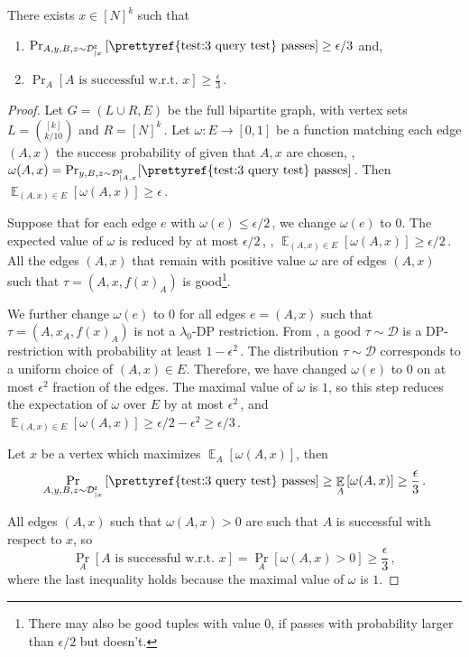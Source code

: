 \documentclass{toc}
\newcommand{\Prob}[2][]{\Pr_{{#1}}\left[#2\right]} %
\DeclareMathOperator*{\E}{\mathbb{E}} %
\newcommand{\Ex}[2][]{\E_{{#1}}\Brac{#2}} %
\newcommand{\Brac}[1]{\left[#1\right]} %
\newcommand\f{f} %
\newcommand{\D}{\mathcal{D}^{\mathsf{z}}} %
\begin{document}
\begin{claim}\label{claim:fix x}
	There exists  $x\in[N]^k$ such that
	\begin{enumerate}
	\item  $\Prob[A,y,B,z\sim \D_{|x}]{\textrm{\prettyref{test:3 query test} passes}}\geq 
	\epsilon/3$ %
	 and,
	\item
	$\Prob[A]{A \textrm{ is successful w.r.t. }x}\geq \frac{\epsilon}{3}$\,.
	\end{enumerate}
\end{claim}
\begin{proof}
	Let $G=(L\cup R,E)$ be the full bipartite graph, with vertex sets $L = \binom{[k]}{k/10}$ and $R = [N]^k$\,. Let $\omega:E\rightarrow[0,1]$ be a function matching each edge  $(A,x)$ the success probability of   given that $A,x$ are chosen, \ie, $\omega(A,x) =\Pr_{y,B,z \sim \D_{|A,x}}[\textrm{\prettyref{test:3 query test} passes}]$\,. Then $\E_{(A,x)\in E}[\omega(A,x)]\geq \epsilon$\,.
	
	Suppose that for each edge $e$ with $\omega(e)\leq 
\epsilon/2$\,, %
 we change $\omega(e)$ to $0$. The expected value of $\omega$ is reduced by at most 
$\epsilon/2$\,, %
 \ie, $\E_{(A,x)\in E}[\omega(A,x)]\geq 
	\epsilon/2$\,. %
	All the edges $ (A,x)$ that remain with positive value $\omega$ are of edges $(A,x)$ such that $\tau=(A,x,\f(x)_A)$ is good\footnote{There may also be good tuples with value $0$, if  passes with probability larger than 
	$\epsilon/2$ %
	 but  doesn't.}. 
	
	We further change $\omega(e)$ to $0$  for all edges $e=(A,x)$ such that $\tau = (A,x_A,\f(x)_A)$ is not a $\lambda_0$-DP restriction.
	From , a good $\tau\sim\mathcal{D}$ is a DP-restriction with probability at least $1-\epsilon^2$\,. The distribution $\tau\sim\mathcal{D}$ corresponds to a uniform choice of $(A,x)\in E$. Therefore, we have changed $\omega(e)$ to $0$ on at most $\epsilon^2$ fraction of the edges. The maximal value of $\omega$ is $1$, so this step reduces the expectation of $\omega$ over $E$  by at most $\epsilon^2$\,, and  $\E_{(A,x)\in E}[\omega(A,x)]\geq 
	\epsilon/2-\epsilon^2 \geq \epsilon/3$\,. %
	
	Let $x$ be a vertex which maximizes $\E_{A}[\omega(A,x)]$, then
	\[\Prob[A,y,B,z\sim \D_{|x}]{\textrm{\prettyref{test:3 query test} passes}} \geq \Ex[A]{\omega(A,x)} \geq  \frac{\epsilon}{3}\,. \]%
	
	All edges $(A,x)$ such that $\omega(A,x)>0$ are such that $A$ is successful with respect to $x$, so
	\[\Prob[A]{A \textrm{ is successful w.r.t. }x}= \Prob[A]{\omega(A,x) > 0} \geq \frac{\epsilon}{3}\,, \]%
where the last inequality holds because the maximal value of $\omega$ is $1$.
\end{proof}
\end{document}
